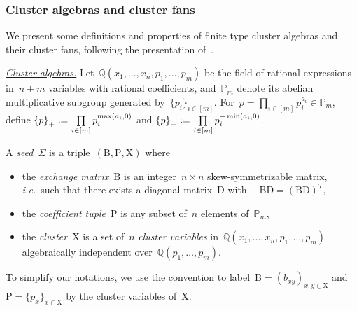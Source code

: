 \documentclass{amsart}
\theoremstyle{definition}
\newcommand{\Q}{\mathbb{Q}} %
\newcommand{\eqdef}{\mbox{\,\raisebox{0.2ex}{\scriptsize\ensuremath{\mathrm:}}\ensuremath{=}\,}} %
\newcommand{\ie}{\textit{i.e.}~} %
\newcommand{\darkblue}{\color{darkblue}} %
\newcommand{\defn}[1]{\textsl{\darkblue #1}} %
\newcommand{\para}[1]{\medskip\noindent\uline{\textit{#1.}}} %
\newcommand{\Trop}[1]{\mathbb{P}_{#1}} %
\newcommand{\positiveExponents}[1]{\left\{#1\right\}_+} %
\newcommand{\negativeExponents}[1]{\left\{#1\right\}_-} %
\newcommand{\seed}{\Sigma} %
\newcommand{\cluster}{\mathrm{X}} %
\newcommand{\coefficients}{\mathrm{P}} %
\newcommand{\B}{\mathrm{B}} %
\newcommand{\D}{\mathrm{D}} %
\begin{document}

\subsubsection{Cluster algebras and cluster fans}

We present some definitions and properties of finite type cluster algebras and their cluster fans, following the presentation of~\cite{HohlwegPilaudStella}.

\para{Cluster algebras}
%
Let~$\Q(x_1, \dots, x_n, p_1, \dots, p_m)$ be the field of rational expressions in~$n+m$ variables with rational coefficients, and~$\Trop{m}$ denote its abelian multiplicative subgroup generated by~$\{p_i\}_{i \in [m]}$.
For~$p = \prod\limits_{i \in [m]} p_i^{a_i} \in \Trop{m}$, define
\(
\positiveExponents{p} \eqdef \prod\limits_{i \in [m]} p_i^{\max(a_i,0)}
\)
and
\(
\negativeExponents{p} \eqdef \prod\limits_{i \in [m]} p_i^{-\min(a_i,0)}
\).

\medskip
A \defn{seed}~$\seed$ is a triple~$(\B, \coefficients, \cluster)$ where
\begin{itemize}
\item the \defn{exchange matrix}~$\B$ is an integer~$n \times n$ skew-symmetrizable matrix, \ie such that there exists a diagonal matrix~$\D$ with~$-\B\D = (\B\D)^T$,
\item the \defn{coefficient tuple}~$\coefficients$ is any subset of~$n$ elements of~$\Trop{m}$,
\item the \defn{cluster}~$\cluster$ is a set of~$n$ \defn{cluster variables} in~$\Q(x_1, \dots, x_n, p_1, \dots, p_m)$ algebraically independent over~$\Q(p_1, \dots, p_m)$.
\end{itemize}
To simplify our notations, we use the convention to label~$\B = (b_{xy})_{x,y \in \cluster}$ and~$\coefficients = \{p_x\}_{x \in \cluster}$ by the cluster variables of~$\cluster$.
\end{document}
